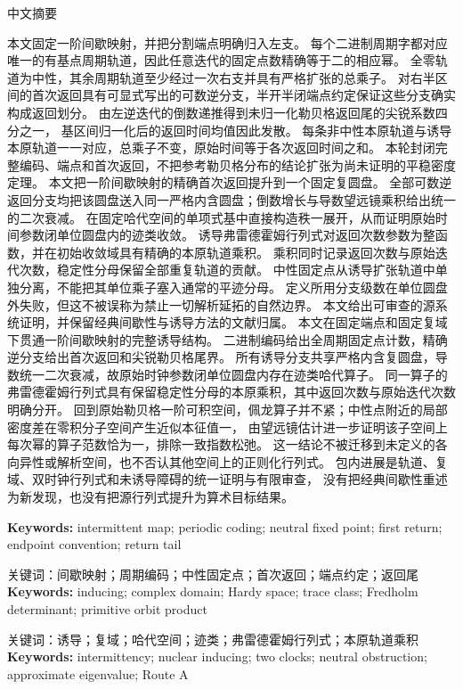 \documentclass[10pt]{article}
\begin{document}
\begin{center}{\cjkfont 中文摘要}\end{center}
{\cjkfont\small\raggedright
\ifcase\CRevisionRound
本文固定一阶间歇映射，并把分割端点明确归入左支。
每个二进制周期字都对应唯一的有基点周期轨道，因此任意迭代的固定点数精确等于二的相应幂。
全零轨道为中性，其余周期轨道至少经过一次右支并具有严格扩张的总乘子。
对右半区间的首次返回具有可显式写出的可数逆分支，半开半闭端点约定保证这些分支确实构成返回划分。
由左逆迭代的倒数递推得到未归一化勒贝格返回尾的尖锐系数四分之一，
基区间归一化后的返回时间均值因此发散。
每条非中性本原轨道与诱导本原轨道一一对应，总乘子不变，原始时间等于各次返回时间之和。
本轮封闭完整编码、端点和首次返回，不把参考勒贝格分布的结论扩张为尚未证明的平稳密度定理。
\or
本文把一阶间歇映射的精确首次返回提升到一个固定复圆盘。
全部可数逆返回分支均把该圆盘送入同一严格内含圆盘；倒数增长与导数望远镜乘积给出统一的二次衰减。
在固定哈代空间的单项式基中直接构造秩一展开，从而证明原始时间参数闭单位圆盘内的迹类收敛。
诱导弗雷德霍姆行列式对返回次数参数为整函数，并在初始收敛域具有精确的本原轨道乘积。
乘积同时记录返回次数与原始迭代次数，稳定性分母保留全部重复轨道的贡献。
中性固定点从诱导扩张轨道中单独分离，不能把其单位乘子塞入通常的平迹分母。
定义所用分支级数在单位圆盘外失败，但这不被误称为禁止一切解析延拓的自然边界。
本文给出可审查的源系统证明，并保留经典间歇性与诱导方法的文献归属。
\else
本文在固定端点和固定复域下贯通一阶间歇映射的完整诱导结构。
二进制编码给出全周期固定点计数，精确逆分支给出首次返回和尖锐勒贝格尾界。
所有诱导分支共享严格内含复圆盘，导数统一二次衰减，故原始时钟参数闭单位圆盘内存在迹类哈代算子。
同一算子的弗雷德霍姆行列式具有保留稳定性分母的本原乘积，其中返回次数与原始迭代次数明确分开。
回到原始勒贝格一阶可积空间，佩龙算子并不紧；中性点附近的局部密度差在零积分子空间产生近似本征值一，
由望远镜估计进一步证明该子空间上每次幂的算子范数恰为一，排除一致指数松弛。
这一结论不被迁移到未定义的各向异性或解析空间，也不否认其他空间上的正则化行列式。
包内进展是轨道、复域、双时钟行列式和未诱导障碍的统一证明与有限审查，
没有把经典间歇性重述为新发现，也没有把源行列式提升为算术目标结果。
\fi\par}
\medskip
\ifcase\CRevisionRound
\noindent\textbf{Keywords:} intermittent map; periodic coding; neutral fixed point; first return; endpoint convention; return tail

{\cjkfont\noindent 关键词：间歇映射；周期编码；中性固定点；首次返回；端点约定；返回尾}
\or
\noindent\textbf{Keywords:} inducing; complex domain; Hardy space; trace class; Fredholm determinant; primitive orbit product

{\cjkfont\noindent 关键词：诱导；复域；哈代空间；迹类；弗雷德霍姆行列式；本原轨道乘积}
\else
\noindent\textbf{Keywords:} intermittency; nuclear inducing; two clocks; neutral obstruction; approximate eigenvalue; Route A
\end{document}
